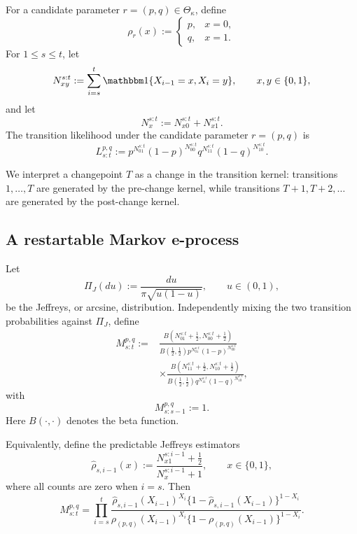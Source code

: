 \documentclass[12pt]{article}
\theoremstyle{spaced}
\theoremstyle{remark}
\begin{document}
For a candidate parameter \(r=(p,q)\in\Theta_\kappa\), define
\[
    \rho_r(x)
    :=
    \begin{cases}
        p, & x=0,\\
        q, & x=1.
    \end{cases}
\]
For \(1\le s\le t\), let
\[
    N_{xy}^{s:t}
    :=
    \sum_{i=s}^t
    \mathbbm 1\{X_{i-1}=x,X_i=y\},
    \qquad x,y\in\{0,1\},
\]
and let
\[
    N_x^{s:t}:=N_{x0}^{s:t}+N_{x1}^{s:t}.
\]
The transition likelihood under the candidate parameter \(r=(p,q)\)
is
\[
    L_{s:t}^{p,q}
    :=
    p^{N_{01}^{s:t}}
    (1-p)^{N_{00}^{s:t}}
    q^{N_{11}^{s:t}}
    (1-q)^{N_{10}^{s:t}}.
\]

We interpret a changepoint \(T\) as a change in the transition kernel:
transitions \(1,\ldots,T\) are generated by the pre-change kernel,
while transitions \(T+1,T+2,\ldots\) are generated by the post-change
kernel.

\subsection{A restartable Markov e-process}

Let
\[
    \Pi_J(du)
    :=
    \frac{du}{\pi\sqrt{u(1-u)}},
    \qquad u\in(0,1),
\]
be the Jeffreys, or arcsine, distribution.  Independently mixing the
two transition probabilities against \(\Pi_J\), define
\begin{align}
    M_{s:t}^{p,q}
    :={}&
    \frac{
        B\left(
            N_{01}^{s:t}+\frac12,
            N_{00}^{s:t}+\frac12
        \right)
    }{
        B\left(\frac12,\frac12\right)
        p^{N_{01}^{s:t}}
        (1-p)^{N_{00}^{s:t}}
    }
    \nonumber\\
    &\times
    \frac{
        B\left(
            N_{11}^{s:t}+\frac12,
            N_{10}^{s:t}+\frac12
        \right)
    }{
        B\left(\frac12,\frac12\right)
        q^{N_{11}^{s:t}}
        (1-q)^{N_{10}^{s:t}}
    },
    \label{eq:markov-jeffreys-eprocess}
\end{align}
with
\[
    M_{s:s-1}^{p,q}:=1.
\]
Here \(B(\cdot,\cdot)\) denotes the beta function.

Equivalently, define the predictable Jeffreys estimators
\[
    \widehat\rho_{s,i-1}(x)
    :=
    \frac{
        N_{x1}^{s:i-1}+\frac12
    }{
        N_x^{s:i-1}+1
    },
    \qquad x\in\{0,1\},
\]
where all counts are zero when \(i=s\).  Then
\begin{equation}
\label{eq:markov-eprocess-predictive}
    M_{s:t}^{p,q}
    =
    \prod_{i=s}^t
    \frac{
        \widehat\rho_{s,i-1}(X_{i-1})^{X_i}
        \{1-\widehat\rho_{s,i-1}(X_{i-1})\}^{1-X_i}
    }{
        \rho_{(p,q)}(X_{i-1})^{X_i}
        \{1-\rho_{(p,q)}(X_{i-1})\}^{1-X_i}
    }.
\end{equation}
\end{document}
